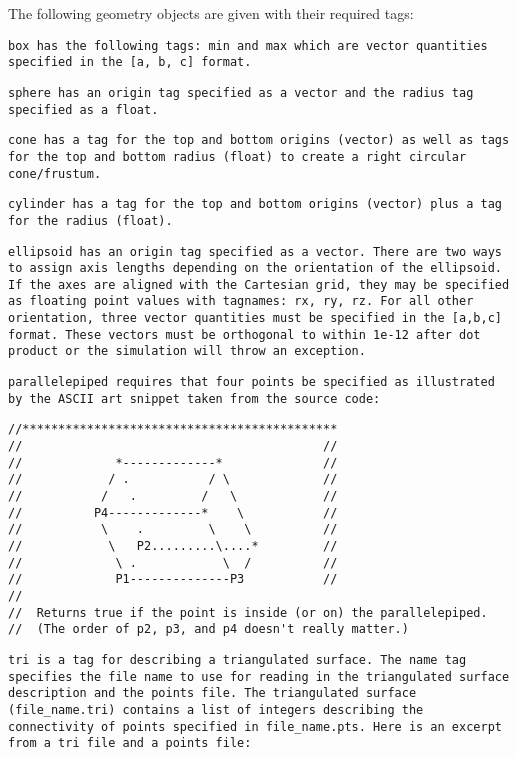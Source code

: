 The following geometry objects are given with their required tags:

\tt box \normalfont has the following tags: min and max which are
vector quantities specified in the \tt [a, b, c] \normalfont format.

\tt sphere \normalfont has an origin tag specified as a vector and the
radius tag specified as a float.

\tt cone \normalfont has a tag for the top and bottom origins (vector)
as well as tags for the top and bottom radius (float) to create a
right circular cone/frustum.

\tt cylinder \normalfont has a tag for the top and bottom origins
(vector) plus a tag for the radius (float).

\tt ellipsoid \normalfont has an origin tag specified as a vector.  There are 
two ways to assign axis lengths depending on the orientation of the ellipsoid.
If the axes are aligned with the Cartesian grid, they may be specified as 
floating point values with tagnames: rx, ry, rz.  For all other orientation, 
three vector quantities must be specified in the \tt [a,b,c] \normalfont format. 
These vectors must be orthogonal to within 1e-12 after dot product or the 
simulation will throw an exception.

\tt parallelepiped \normalfont requires that four points be specified as
illustrated by the ASCII art snippet taken from the source code:

\begin{Verbatim}[fontsize=\footnotesize]
//********************************************
//                                          //
//             *-------------*              //
//            / .           / \             //
//           /   .         /   \            //
//          P4-------------*    \           //
//           \    .         \    \          //
//            \   P2.........\....*         //
//             \ .            \  /          //
//             P1--------------P3           //
//
//  Returns true if the point is inside (or on) the parallelepiped.
//  (The order of p2, p3, and p4 doesn't really matter.)
\end{Verbatim}

\tt tri \normalfont is a tag for describing a triangulated surface.
The name tag specifies the file name to use for reading in the
triangulated surface description and the points file.  The
triangulated surface (file\_name.tri) contains a list of integers
describing the connectivity of points specified in file\_name.pts.
Here is an excerpt from a tri file and a points file:

